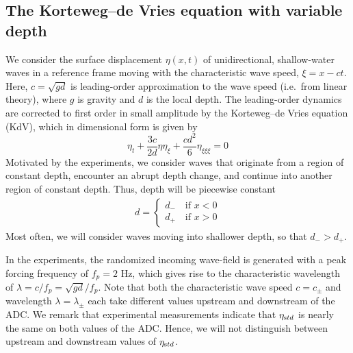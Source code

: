 \documentclass[11pt]{article}
\newcommand{\freqp}{f_p}
\newcommand{\etastd}{\eta_{\text std}}
\newcommand{\depth}{d}
\newcommand{\dup}{\depth_{-}}
\newcommand{\ddn}{\depth_{+}}
\newcommand{\lam}{\lambda}
\newcommand{\lamupdn}{\lam_{\pm}}
\begin{document}
\subsection{The Korteweg–de Vries equation with variable depth}

We consider the surface displacement $\eta(x,t)$ of unidirectional, shallow-water waves in a reference frame moving with the characteristic wave speed, $\xi = x - ct$. Here, $c = \sqrt{g \depth}$ is leading-order approximation to the wave speed (i.e.~from linear theory), where $g$ is gravity and $\depth$ is the local depth.
The leading-order dynamics are corrected to first order in small amplitude by the Korteweg–de Vries equation (KdV), which in dimensional form is given by \cite{whitham2011linear}
\begin{equation}
\label{KdV}
\eta_t + \frac{3 c}{2 \depth} \eta \eta_{\xi} + \frac{c \depth^2}{6} \eta_{\xi \xi \xi} = 0
\end{equation}
Motivated by the experiments, we consider waves that originate from a region of constant depth, encounter an abrupt depth change, and continue into another region of constant depth. Thus, depth will be piecewise constant
\begin{align}
\depth = 
\begin{cases}
\dup \quad \mbox{if } x<0 \\
\ddn \quad \mbox{if } x>0
\end{cases}
\end{align}
Most often, we will consider waves moving into shallower depth, so that $\dup > \ddn$. 

In the experiments, the randomized incoming wave-field is generated with a peak forcing frequency of $\freqp = 2$ Hz, which gives rise to the characteristic wavelength of $\lam = c/\freqp = \sqrt{g \depth} / \freqp$. Note that both the characteristic wave speed $c = c_{\pm}$ and wavelength $\lam = \lamupdn$ each take different values upstream and downstream of the ADC. We remark that experimental measurements indicate that $\etastd$ is nearly the same on both values of the ADC. Hence, we will not distinguish between upstream and downstream values of $\etastd$.

 
\end{document}
